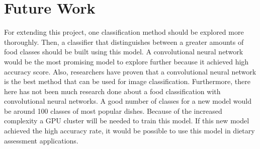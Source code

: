 \section{Future Work}

For extending this project, one classification method should be explored more thoroughly. Then, a classifier that distinguishes between a greater amounts of food classes should be built using this model.   A convolutional neural network would be the most promising model to explore further because it achieved high accuracy score. Also, researchers have proven that a convolutional neural network is the best method that can be used for image classification. Furthermore, there here has not been much research done about  a food classification with convolutional neural networks.  A good number of classes for a new model would be around 100 classes of most popular dishes.  Because of the increased complexity a GPU cluster will be needed to train this model. If this new model achieved the high accuracy rate, it would be possible to use this model in dietary assessment applications.


